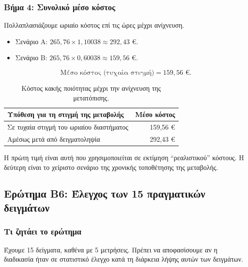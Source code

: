 \documentclass[12pt,a4paper]{article}
\begin{document}
\subsubsection*{Βήμα 4: Συνολικό μέσο κόστος}

Πολλαπλασιάζουμε ωριαίο κόστος επί τις ώρες μέχρι ανίχνευση.

\begin{itemize}[leftmargin=2.2em]
    \item Σενάριο Α: \(265{,}76\times 1{,}10038\approx 292{,}43\) €.
    \item Σενάριο Β: \(265{,}76\times 0{,}60038\approx 159{,}56\) €.
\end{itemize}

\[
    \boxed{\text{Μέσο κόστος (τυχαία στιγμή)} = 159{,}56 \text{ €}}.
\]

\begin{table}[H]
\centering
\caption{Κόστος κακής ποιότητας μέχρι την ανίχνευση της μετατόπισης.}
\begin{tabular}{lr}
\toprule
\textbf{Υπόθεση για τη στιγμή της μεταβολής} & \textbf{Μέσο κόστος} \\
\midrule
Σε τυχαία στιγμή του ωριαίου διαστήματος & 159,56 € \\
Αμέσως μετά από δειγματοληψία & 292,43 € \\
\bottomrule
\end{tabular}
\end{table}

\begin{intuition}
Η πρώτη τιμή είναι αυτή που χρησιμοποιείται σε εκτίμηση ``ρεαλιστικού''
κόστους. Η δεύτερη είναι το χείριστο σενάριο της χρονικής τοποθέτησης
της μεταβολής.
\end{intuition}

\subsection{Ερώτημα Β6: Έλεγχος των 15 πραγματικών δειγμάτων}

\subsubsection*{Τι ζητάει το ερώτημα}

Έχουμε 15 δείγματα, καθένα με 5 μετρήσεις. Πρέπει να αποφασίσουμε αν η
διαδικασία ήταν σε στατιστικό έλεγχο κατά τη διάρκεια λήψης αυτών των
δειγμάτων.
\end{document}
